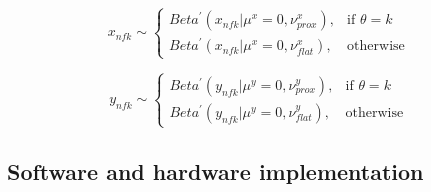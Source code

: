\begin{equation*}
    x_{nfk} \sim
\begin{cases}
    Beta^{\prime}(x_{nfk}|\mu^x=0,\nu^x_{prox}),& \text{if } \theta = k\\
    Beta^{\prime}(x_{nfk}|\mu^x=0,\nu^x_{flat}),& \text{otherwise}
\end{cases}
\end{equation*}

\begin{equation*}
    y_{nfk} \sim
\begin{cases}
    Beta^{\prime}(y_{nfk}|\mu^y=0,\nu^y_{prox}),& \text{if } \theta = k\\
    Beta^{\prime}(y_{nfk}|\mu^y=0,\nu^y_{flat}),& \text{otherwise}
\end{cases}
\end{equation*}







\subsection{Software and hardware implementation}

